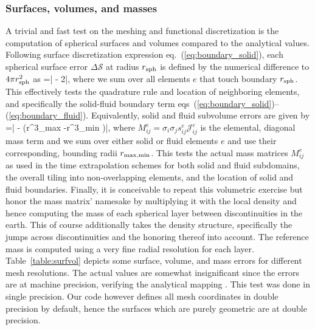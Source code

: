 \subsubsection{Surfaces, volumes, and masses}
%
A trivial and fast test on the meshing and functional discretization
is the computation of spherical surfaces and volumes compared to the analytical
values. Following surface discretization expression eq.~(\ref{eq:boundary_solid}),
each spherical surface error $\Delta {\mathcal S}$ at radius
$r_{\rm sph}$ is defined by the numerical difference to $4\pi r_{\rm sph}^2$ as
%
\eq
{}=\left| -
2\right|,
\en
%
where we sum over all elements $e$ that touch boundary $r_{\rm sph}$.
This effectively tests the quadrature rule and location of neighboring elements,
and specifically the solid-fluid boundary term
eqs~(\ref{eq:boundary_solid})--(\ref{eq:boundary_fluid}).
%
Equivalently, solid and fluid subvolume errors are given by
%
\eq
{}=\left| -
\left(r^3_{\rm max} -r^3_{\rm min} \right)\right|,
\en
%
where $M_{ij}^e=\sigma_i\sigma_j s_{ij}^e {\mathcal J}_{ij}^e $ is the elemental,
diagonal mass term and we sum over either solid or fluid elements $e$ and use their
corresponding, bounding radii $r_{\rm max,min}$. This tests the actual mass
matrices $M_{ij}^e$ as used in the time extrapolation schemes
for both solid and fluid subdomains, the overall tiling into non-overlapping
elements, and the location of solid and fluid boundaries.
Finally, it is conceivable to repeat this volumetric exercise but honor the mass
matrix' namesake by multiplying it with the local density and hence computing
the mass of each spherical layer between discontinuities in the earth.
This of course additionally takes the density structure, specifically the jumps
across discontinuities and the honoring thereof into account.
The reference mass is computed using a very fine radial resolution for each
layer. Table~\ref{table:surfvol}
depicts some surface, volume, and mass errors for different mesh resolutions.
The actual values are somewhat insignificant since the errors are at machine
precision, verifying the analytical mapping \citep[][Appendix~A]{nissen+:07b}.
This test was done in single precision. Our code however defines all
mesh coordinates in double precision by default, hence the surfaces which are
purely geometric are at double precision.
%
